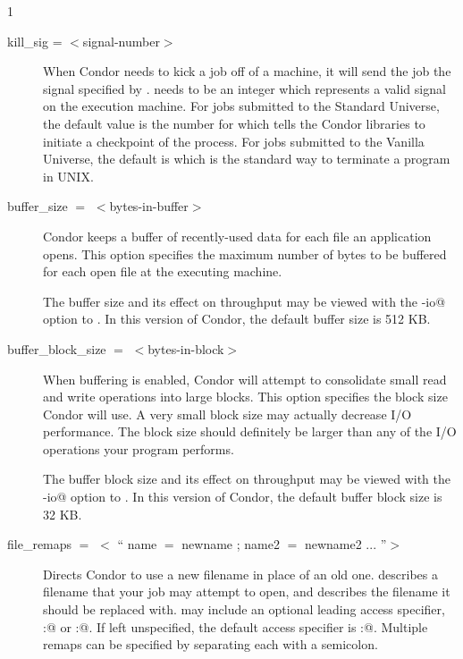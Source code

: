 \begin{ManPage}{\label{man-condor-submit}}{1}
\begin{description}

\item[kill\_sig = $<$signal-number$>$] When Condor needs to kick a job
off of a machine, it will send the job the signal specified by
.   needs to be an integer which
represents a valid signal on the execution machine.  For jobs submitted
to the Standard Universe, the default value is the number for
\verb@SIGTSTP@ which tells the Condor libraries to initiate a checkpoint
of the process.  For jobs submitted to the Vanilla Universe, the default 
is \verb@SIGTERM@ which is the standard way to terminate a program in UNIX.  


\item[buffer\_size $=$ $<$bytes-in-buffer$>$]
Condor keeps a buffer of recently-used data for each file an
application opens.  This option specifies the maximum
number of bytes to be buffered for each open file at the executing machine.

The buffer size and its effect on throughput may be viewed with
the \verb@-io@ option to . 
In this version of Condor, the default buffer size is 512 KB.


\item[buffer\_block\_size $=$ $<$bytes-in-block$>$]
When buffering is enabled, Condor will attempt to consolidate small read
and write operations into large blocks.  This option specifies the block
size Condor will use.  A very small block size may actually decrease I/O performance.
The block size should definitely be larger than any of the I/O operations
your program performs.

The buffer block size and its effect on throughput may be viewed with
the \verb@-io@ option to . 
In this version of Condor, the default buffer block size is 32 KB.


\item[file\_remaps $=$ $<$ `` name $=$ newname ; name2 $=$ newname2 ... ''$>$ ]
Directs Condor to use a new filename in place of an old one.  
describes a filename that your job may attempt to open, and 
describes the filename it should be replaced with.
 may include an optional leading
access specifier, \verb@local:@ or \verb@remote:@.  If left unspecified,
the default access specifier is \verb@remote:@.  Multiple remaps can be 
specified by separating each with a semicolon.


\end{description}
\end{ManPage}
